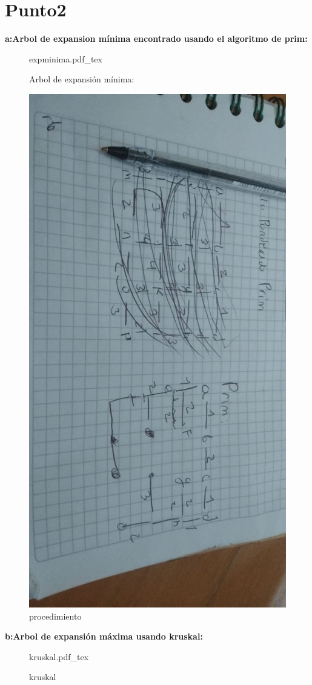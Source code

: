 \documentclass[10pt,a4paper]{article} %
\newcommand{\incfig}[1]{%
    \def\svgwidth{\columnwidth}
    {#1.pdf_tex}
}
\begin{document}
    \section{Punto2}
        \textbf{a:Arbol de expansion mínima encontrado usando el algoritmo de prim:}
        \\
            \begin{figure}[ht]
                \centering
                \incfig{expminima}
                \caption{Arbol de expansión mínima:}
                \label{fig:expminima}
            \end{figure}
            \begin{figure}[h!]
                \centering
                \includegraphics[width=0.4\linewidth]{proc2.jpeg}
                \caption{procedimiento}
                \label{fig}
            \end{figure}




        \newpage
        \textbf{b:Arbol de expansión máxima usando kruskal:}
        \\
            \begin{figure}[ht]
                \centering
                \incfig{kruskal}
                \caption{kruskal}
                \label{fig:kruskal}
            \end{figure}
\end{document}
